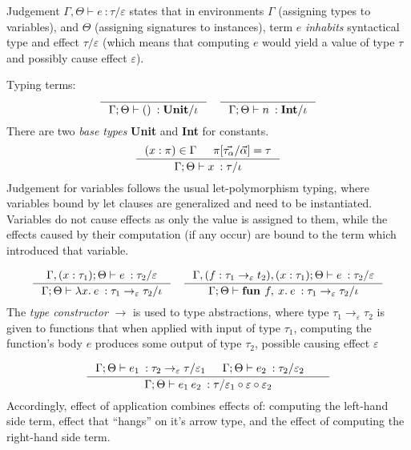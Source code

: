 \documentclass[declaration,shortabstract]{iithesis}
\theoremstyle{definition} \newtheorem{definition}{Definition}[section]
\newcommand{\types}[4][\Gamma;\Theta]{\ensuremath{{{#1} \vdash {#2} \: : {#3}/{#4}}}}
\newcommand{\arrow}[3]{{#1}\rightarrow_{#2}{#3}}
\newcommand{\lam}[1][x]{\ensuremath{\lambda #1.\:}}
\newcommand{\fun}[1][f,\:x]{\ensuremath{\textbf{fun } #1.\:}}
\begin{document}
Judgement $\types[\Gamma, \Theta]{e}{\tau}{\varepsilon}$ states that in environments $\Gamma$ (assigning types to variables),
and $\Theta$ (assigning signatures to instances), term $e$ \textit{inhabits} syntactical type and effect $\tau / \varepsilon$ (which means that computing $e$ would yield a value of type $\tau$ and possibly cause effect $\varepsilon$).

Typing terms:
$$
\inference{}{\types{()}{\textbf{Unit}}{\iota}}
\quad
\inference{}{\types{n}{\textbf{Int}}{\iota}}{}
$$
\setlength{\jot}{10pt}
There are two \textit{base types} \textbf{Unit} and \textbf{Int} for constants.
$$
\inference{(x : \pi) \in \Gamma & \pi[\vec{\tau_\alpha} / \vec{\alpha}] = \tau}{\types{x}{\tau}{\iota}}
$$
Judgement for variables follows the usual let-polymorphism typing, 
where variables bound by let clauses are generalized and need to be instantiated.
Variables do not cause effects as only the value is assigned to them,
while the effects caused by their computation (if any occur)
are bound to the term which introduced that variable.

$$
\inference{
    \types[\Gamma,(x : \tau_1); \Theta]{e}{\tau_2}{\varepsilon} 
}{
    \types{\lam e}{\arrow{\tau_1}{\varepsilon}{\tau_2}}{\iota}
}
\quad
\inference{
    \types[\Gamma, (f : \arrow{\tau_1}{\varepsilon}{t_2}),(x : \tau_1); \Theta]{e}{\tau_2}{\varepsilon} 
}{
    \types{\fun e}{\arrow{\tau_1}{\varepsilon}{\tau_2}}{\iota}
}
$$
The \textit{type constructor} $\rightarrow$ is used to type abstractions,
where type $\arrow{\tau_1}{\varepsilon}{\tau_2}$ is given to functions
that when applied with input of type $\tau_1$, computing the function's body $e$ produces some output of type $\tau_2$, possible causing effect $\varepsilon$

$$
\inference{
    \types{e_1}{\arrow{\tau_2}{\varepsilon}{\tau}}{\varepsilon_1} &
    \types{e_2}{\tau_2}{\varepsilon_2} &
}{
    \types{e_1\:e_2}{\tau}{\varepsilon_1 \circ \varepsilon \circ \varepsilon_2}
}
$$
Accordingly, effect of application combines effects of: computing the left-hand side term,
effect that ``hangs'' on it's arrow type, and the effect of computing the right-hand side term.
\end{document}
